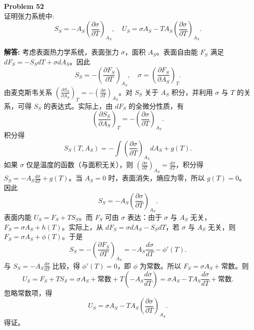 \documentclass[12pt, a4paper, oneside]{ctexart}
\newenvironment{solution}{\par\noindent\textbf{解答:}\quad}{\par}
\begin{document}
\begin{mdframed}[backgroundcolor=gray!10, linewidth=0pt]
    \textbf{Problem 52} \\
    证明张力系统中:
    \[
    S_S = -A_S \left(\frac{\partial \sigma}{\partial T}\right)_{A_S}, \quad U_S = \sigma A_S - T A_S \left(\frac{\partial \sigma}{\partial T}\right)_{A_S}.
    \]
\end{mdframed}
\begin{solution}
    考虑表面热力学系统，表面张力 $\sigma$，面积 $A_S$。表面自由能 $F_S$ 满足 $dF_S = -S_S dT + \sigma dA_S$。因此
    \[
    S_S = -\left(\frac{\partial F_S}{\partial T}\right)_{A_S}, \quad \sigma = \left(\frac{\partial F_S}{\partial A_S}\right)_T.
    \]
    由麦克斯韦关系 $\left(\frac{\partial S_S}{\partial A_S}\right)_T = -\left(\frac{\partial \sigma}{\partial T}\right)_{A_S}$。对 $S_S$ 关于 $A_S$ 积分，并利用 $\sigma$ 与 $T$ 的关系，可得 $S_S$ 的表达式。实际上，由 $dF_S$ 的全微分性质，有
    \[
    \left(\frac{\partial S_S}{\partial A_S}\right)_T = -\left(\frac{\partial \sigma}{\partial T}\right)_{A_S}.
    \]
    积分得
    \[
    S_S(T, A_S) = -\int \left(\frac{\partial \sigma}{\partial T}\right)_{A_S} dA_S + g(T).
    \]
    如果 $\sigma$ 仅是温度的函数（与面积无关），则 $\left(\frac{\partial \sigma}{\partial T}\right)_{A_S} = \frac{d\sigma}{dT}$，积分得 $S_S = -A_S \frac{d\sigma}{dT} + g(T)$。当 $A_S=0$ 时，表面消失，熵应为零，所以 $g(T)=0$。因此
    \[
    S_S = -A_S \left(\frac{\partial \sigma}{\partial T}\right)_{A_S}.
    \]
    表面内能 $U_S = F_S + T S_S$。而 $F_S$ 可由 $\sigma$ 表达：由于 $\sigma$ 与 $A_S$ 无关，$F_S = \sigma A_S + h(T)$。实际上，从 $dF_S = \sigma dA_S - S_S dT$，若 $\sigma$ 与 $A_S$ 无关，则 $F_S = \sigma A_S + \phi(T)$。于是
    \[
    S_S = -\left(\frac{\partial F_S}{\partial T}\right)_{A_S} = -A_S \frac{d\sigma}{dT} - \phi'(T).
    \]
    与 $S_S = -A_S \frac{d\sigma}{dT}$ 比较，得 $\phi'(T)=0$，即 $\phi$ 为常数。所以 $F_S = \sigma A_S + \text{常数}$。则
    \[
    U_S = F_S + T S_S = \sigma A_S + \text{常数} + T \left(-A_S \frac{d\sigma}{dT}\right) = \sigma A_S - T A_S \frac{d\sigma}{dT} + \text{常数}.
    \]
    忽略常数项，得
    \[
    U_S = \sigma A_S - T A_S \left(\frac{\partial \sigma}{\partial T}\right)_{A_S}.
    \]
    得证。
\end{solution}
\end{document}
